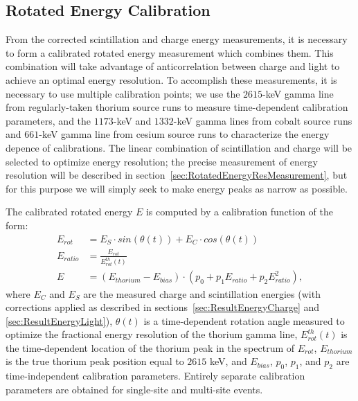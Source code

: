 \subsection{Rotated Energy Calibration}\label{sec:RotatedEnergyCalibration}

From the corrected scintillation and charge energy measurements, it is necessary to form a calibrated rotated energy measurement which combines them.  This combination will take advantage of anticorrelation between charge and light to achieve an optimal energy resolution.  To accomplish these measurements, it is necessary to use multiple calibration points; we use the $2615$-keV gamma line from regularly-taken thorium source runs to measure time-dependent calibration parameters, and the $1173$-keV and $1332$-keV gamma lines from cobalt source runs and $661$-keV gamma line from cesium source runs to characterize the energy depence of calibrations.  The linear combination of scintillation and charge will be selected to optimize energy resolution; the precise measurement of energy resolution will be described in section~\ref{sec:RotatedEnergyResMeasurement}, but for this purpose we will simply seek to make energy peaks as narrow as possible.

The calibrated rotated energy $E$ is computed by a calibration function of the form:
\begin{align}
E_{rot} &= E_S \cdot sin(\theta(t)) + E_C \cdot cos(\theta(t))\\
E_{ratio} &= \frac{E_{rot}}{E^{th}_{rot}(t)}\\
E &= \left( E_{thorium} - E_{bias} \right) \cdot \left( p_0 + p_1 E_{ratio} + p_2 E_{ratio}^2\right),
\end{align}
where $E_C$ and $E_S$ are the measured charge and scintillation energies (with corrections applied as described in sections~\ref{sec:ResultEnergyCharge} and \ref{sec:ResultEnergyLight}), $\theta(t)$ is a time-dependent rotation angle measured to optimize the fractional energy resolution of the thorium gamma line, $E^{th}_{rot}(t)$ is the time-dependent location of the thorium peak in the spectrum of $E_{rot}$, $E_{thorium}$ is the true thorium peak position equal to $2615$ keV, and $E_{bias}$, $p_0$, $p_1$, and $p_2$ are time-independent calibration parameters.  Entirely separate calibration parameters are obtained for single-site and multi-site events.

